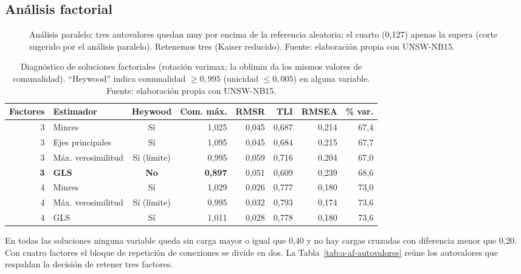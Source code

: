 \subsection{Análisis factorial}
\label{anexo:af}

\begin{figure}[htbp]
  \centering
  \caption[Análisis paralelo del AF]{Análisis paralelo: tres autovalores quedan muy por encima de la referencia aleatoria; el cuarto (0,127) apenas la supera (corte sugerido por el análisis paralelo). Retenemos tres (Kaiser reducido). Fuente: elaboración propia con UNSW-NB15.}
  \label{fig:af-paralelo}
\end{figure}
\begin{table}[htbp]
  \centering
  \caption[Diagnóstico de soluciones factoriales]{Diagnóstico de soluciones factoriales (rotación varimax; la oblimin da los mismos valores de comunalidad). ``Heywood'' indica comunalidad $\ge 0{,}995$ (unicidad $\le 0{,}005$) en alguna variable. Fuente: elaboración propia con UNSW-NB15.}\label{tab:a-af-diagnostico}
  \begin{tablacompacta}
  \begin{tabular}{@{}rlcrrrrr@{}}
  \toprule
  Factores & Estimador & Heywood & Com. máx. & RMSR & TLI & RMSEA & \% var. \\
  \midrule
  3 & Minres & Sí & 1,025 & 0,045 & 0,687 & 0,214 & 67,4 \\
  3 & Ejes principales & Sí & 1,095 & 0,045 & 0,684 & 0,215 & 67,7 \\
  3 & Máx. verosimilitud & Sí (límite) & 0,995 & 0,059 & 0,716 & 0,204 & 67,0 \\
  \textbf{3} & \textbf{GLS} & \textbf{No} & \textbf{0,897} & 0,051 & 0,609 & 0,239 & 68,6 \\
  4 & Minres & Sí & 1,029 & 0,026 & 0,777 & 0,180 & 73,0 \\
  4 & Máx. verosimilitud & Sí (límite) & 0,995 & 0,032 & 0,793 & 0,174 & 73,6 \\
  4 & GLS & Sí & 1,011 & 0,028 & 0,778 & 0,180 & 73,6 \\
  \bottomrule
  \end{tabular}
  \end{tablacompacta}
\end{table}

En todas las soluciones ninguna variable queda sin carga mayor o igual que 0,40 y no hay cargas cruzadas con diferencia menor que 0,20. Con cuatro factores el bloque de repetición de conexiones se divide en dos. La Tabla~\ref{tab:a-af-autovalores} reúne los autovalores que respaldan la decisión de retener tres factores.

